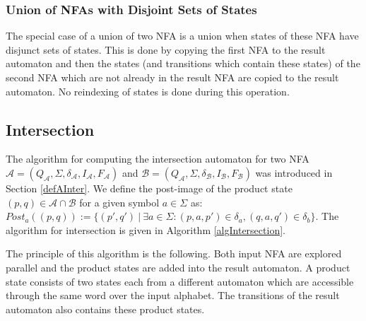 \subsubsection{Union of NFAs with Disjoint Sets of States}
The special case of a union of two NFA is a union when states of these NFA have disjunct sets of states. 
This is done by copying the first NFA to the result automaton and then
the states (and transitions which contain these states) of the second NFA which are not already in the result NFA are copied to the result automaton.
No reindexing of states is done during this operation.

\subsection{Intersection}
The algorithm for computing the intersection automaton for two NFA $\mathcal{A}=(Q_\mathcal{A},\Sigma,\delta_\mathcal{A},I_\mathcal{A},F_\mathcal{A})$
and $\mathcal{B}=(Q_\mathcal{A},\Sigma,\delta_\mathcal{B},I_\mathcal{B},F_\mathcal{B})$ was introduced 
in Section \ref{defAInter}. 
We define the post-image of the product state $(p,q)\in \mathcal{A}\cap\mathcal{B}$ for a given symbol $a\in \Sigma$ as: 
$Post_a((p,q)):=\{(p',q')\ |\ \exists a \in \Sigma: (p,a,p')\in \delta_a, (q,a,q')\in \delta_b\}$.
The algorithm for intersection is given in Algorithm \ref{algIntersection}.

The principle of this algorithm is the following. Both input NFA are explored parallel and the product states are added into the result automaton. 
A product state consists of two states each from a different automaton which are accessible through the same word over the input alphabet. 
The transitions of the result automaton also contains these product states.


